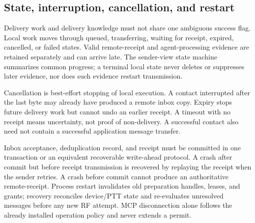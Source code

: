 
\subsection{State, interruption, cancellation, and restart}
Delivery work and delivery knowledge must not share one ambiguous success
flag. Local work moves through queued, transferring, waiting for receipt,
expired, cancelled, or failed states. Valid remote-receipt and agent-processing
evidence are retained separately and can arrive late. The sender-view state
machine summarizes common progress; a terminal local state never deletes or
suppresses later evidence, nor does such evidence restart transmission.

Cancellation is best-effort stopping of local execution. A contact interrupted
after the last byte may already have produced a remote inbox copy. Expiry stops
future delivery work but cannot undo an earlier receipt. A timeout with no
receipt means uncertainty, not proof of non-delivery. A successful contact
also need not contain a successful application message transfer.

Inbox acceptance, deduplication record, and receipt must be committed in one
transaction or an equivalent recoverable write-ahead protocol. A crash after
commit but before receipt transmission is recovered by replaying the receipt
when the sender retries. A crash before commit cannot produce an authoritative
remote-receipt. Process restart invalidates old preparation handles, leases,
and grants; recovery reconciles device/PTT state and re-evaluates unresolved
messages before any new RF attempt. MCP disconnection alone follows the
already installed operation policy and never extends a permit.


